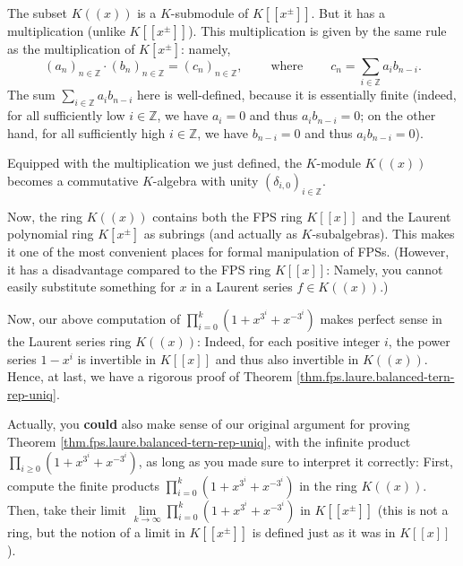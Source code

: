 \begin{theorem}
\label{thm.fps.laure.lauser-ring}The subset $K\left(  \left(  x\right)
\right)  $ is a $K$-submodule of $K\left[  \left[  x^{\pm}\right]  \right]  $.
But it has a multiplication (unlike $K\left[  \left[  x^{\pm}\right]  \right]
$). This multiplication is given by the same rule as the multiplication of
$K\left[  x^{\pm}\right]  $: namely,%
\[
\left(  a_{n}\right)  _{n\in\mathbb{Z}}\cdot\left(  b_{n}\right)
_{n\in\mathbb{Z}}=\left(  c_{n}\right)  _{n\in\mathbb{Z}}%
,\ \ \ \ \ \ \ \ \ \ \text{where}\ \ \ \ \ \ \ \ \ \ c_{n}=\sum_{i\in
\mathbb{Z}}a_{i}b_{n-i}.
\]
The sum $\sum_{i\in\mathbb{Z}}a_{i}b_{n-i}$ here is well-defined, because it
is essentially finite (indeed, for all sufficiently low $i\in\mathbb{Z}$, we
have $a_{i}=0$ and thus $a_{i}b_{n-i}=0$; on the other hand, for all
sufficiently high $i\in\mathbb{Z}$, we have $b_{n-i}=0$ and thus $a_{i}%
b_{n-i}=0$).

Equipped with the multiplication we just defined, the $K$-module $K\left(
\left(  x\right)  \right)  $ becomes a commutative $K$-algebra with unity
$\left(  \delta_{i,0}\right)  _{i\in\mathbb{Z}}$.
\end{theorem}

Now, the ring $K\left(  \left(  x\right)  \right)  $ contains both the FPS
ring $K\left[  \left[  x\right]  \right]  $ and the Laurent polynomial ring
$K\left[  x^{\pm}\right]  $ as subrings (and actually as $K$-subalgebras).
This makes it one of the most convenient places for formal manipulation of
FPSs. (However, it has a disadvantage compared to the FPS ring $K\left[
\left[  x\right]  \right]  $: Namely, you cannot easily substitute something
for $x$ in a Laurent series $f\in K\left(  \left(  x\right)  \right)  $.)

Now, our above computation of $\prod_{i=0}^{k}\left(  1+x^{3^{i}}+x^{-3^{i}%
}\right)  $ makes perfect sense in the Laurent series ring $K\left(  \left(
x\right)  \right)  $: Indeed, for each positive integer $i$, the power series
$1-x^{i}$ is invertible in $K\left[  \left[  x\right]  \right]  $ and thus
also invertible in $K\left(  \left(  x\right)  \right)  $. Hence, at last, we
have a rigorous proof of Theorem \ref{thm.fps.laure.balanced-tern-rep-uniq}.

Actually, you \textbf{could} also make sense of our original argument for
proving Theorem \ref{thm.fps.laure.balanced-tern-rep-uniq}, with the infinite
product $\prod_{i\geq0}\left(  1+x^{3^{i}}+x^{-3^{i}}\right)  $, as long as
you made sure to interpret it correctly: First, compute the finite products
$\prod_{i=0}^{k}\left(  1+x^{3^{i}}+x^{-3^{i}}\right)  $ in the ring $K\left(
\left(  x\right)  \right)  $. Then, take their limit $\lim
\limits_{k\rightarrow\infty}\prod_{i=0}^{k}\left(  1+x^{3^{i}}+x^{-3^{i}%
}\right)  $ in $K\left[  \left[  x^{\pm}\right]  \right]  $ (this is not a
ring, but the notion of a limit in $K\left[  \left[  x^{\pm}\right]  \right]
$ is defined just as it was in $K\left[  \left[  x\right]  \right]  $).

